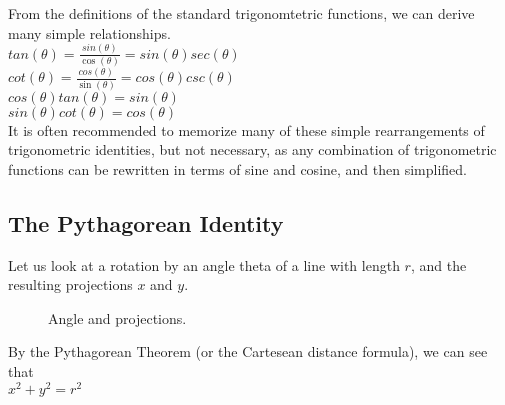 From the definitions of the standard trigonomtetric functions, we can derive many simple relationships. \\

\tab$tan(\theta) = \frac{sin(\theta)}{\cos(\theta)} = sin(\theta)sec(\theta)$\\

\tab$cot(\theta) = \frac{cos(\theta)}{\sin(\theta)} = cos(\theta)csc(\theta)$\\

\tab$cos(\theta)tan(\theta)=sin(\theta)$\\

\tab$sin(\theta)cot(\theta)=cos(\theta)$\\

It is often recommended to memorize many of these simple rearrangements of trigonometric identities, but not necessary, as any combination of trigonometric functions can be rewritten in terms of sine and cosine, and then simplified.\\

\subsection{The Pythagorean Identity}

Let us look at a rotation by an angle theta of a line with length $r$, and the resulting projections $x$ and $y$.\\

\begin{figure}[htb]
\center
\caption{Angle and projections.}
\label{fig:angle and projections}
\end{figure}


By the Pythagorean Theorem (or the Cartesean distance formula), we can see that \\

\tab$x^2 + y^2 = r^2$\\

